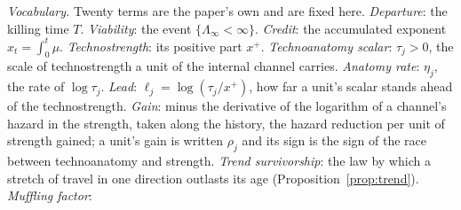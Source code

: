 \emph{Vocabulary.} Twenty terms are the paper's own and are fixed here.
\emph{Departure}: the killing time $T$. \emph{Viability}: the event
$\{\Lambda_\infty<\infty\}$. \emph{Credit}: the accumulated exponent
$x_t=\int_0^t\mu$. \emph{Technostrength}: its positive part $x^+$.
\emph{Technoanatomy scalar}: $\tau_j>0$, the scale of technostrength a
unit of the internal channel carries. \emph{Anatomy rate}: $\eta_j$, the
rate of $\log\tau_j$. \emph{Lead}: $\ell_j=\log(\tau_j/x^+)$, how far a
unit's scalar stands ahead of the technostrength. \emph{Gain}: minus the derivative of the logarithm of a channel's hazard in the strength, taken along the history, the hazard reduction per unit of strength gained; a unit's gain is written $\rho_j$ and its sign is the sign of the race between technoanatomy and strength. \emph{Trend survivorship}: the law by which a stretch of travel in one direction outlasts its age (Proposition~\ref{prop:trend}). \emph{Muffling factor}:
